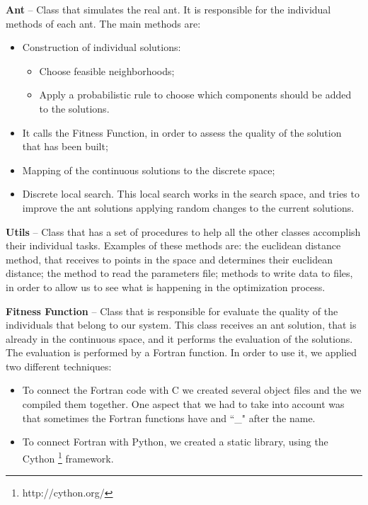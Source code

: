 \textbf{Ant} – Class that simulates the real ant. It is responsible for the individual methods of each ant. The main methods are:
\begin{itemize}
	\item Construction of individual solutions:
		\begin{itemize}
			\item Choose feasible neighborhoods;
			\item Apply a probabilistic rule to choose which components should be added to the solutions.
		\end{itemize}
	\item It calls the Fitness Function, in order to assess the quality of the solution that has been built;
	\item Mapping of the continuous solutions to the discrete space;
	\item Discrete local search. This local search works in the search space, and tries to improve the ant solutions applying random changes to the current solutions.
\end{itemize}

\textbf{Utils} – Class that has a set of procedures to help all the other classes accomplish their individual tasks. Examples of these methods are: the euclidean distance method, that receives to points in the space and determines their euclidean distance; the method to read the parameters file; methods to write data to files, in order to allow us to see what is happening in the optimization process.

\textbf{Fitness Function} – Class that is responsible for evaluate the quality of the individuals that belong to our system. This class receives an ant solution, that is already in the continuous space, and it performs the evaluation of the solutions. The evaluation is performed by a Fortran function. In order to use it, we applied two different techniques:
	\begin{itemize}
		\item To connect the Fortran code with C we created several object files and the we compiled them together. One aspect that we had to take into account was that sometimes the Fortran functions have and ``\_" after the name.
		\item To connect Fortran with Python, we created a static library, using the Cython \footnote{http://cython.org/} framework.
		\end{itemize}


